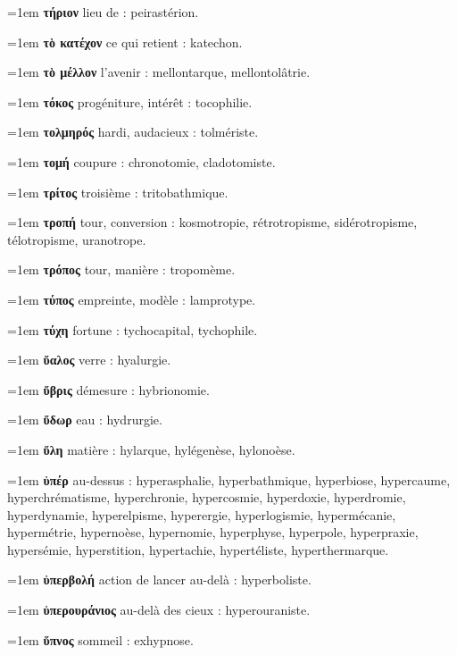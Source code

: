 \hangindent=1em \textbf{τήριον} lieu de : peirastérion.\par
\hangindent=1em \textbf{τὸ κατέχον} ce qui retient : katechon.\par
\hangindent=1em \textbf{τὸ μέλλον} l'avenir : mellontarque, mellontolâtrie.\par
\hangindent=1em \textbf{τόκος} progéniture, intérêt : tocophilie.\par
\hangindent=1em \textbf{τολμηρός} hardi, audacieux : tolmériste.\par
\hangindent=1em \textbf{τομή} coupure : chronotomie, cladotomiste.\par
\hangindent=1em \textbf{τρίτος} troisième : tritobathmique.\par
\hangindent=1em \textbf{τροπή} tour, conversion : kosmotropie, rétrotropisme, sidérotropisme, télotropisme, uranotrope.\par
\hangindent=1em \textbf{τρόπος} tour, manière : tropomème.\par
\hangindent=1em \textbf{τύπος} empreinte, modèle : lamprotype.\par
\hangindent=1em \textbf{τύχη} fortune : tychocapital, tychophile.\par
\hangindent=1em \textbf{ὕαλος} verre : hyalurgie.\par
\hangindent=1em \textbf{ὕβρις} démesure : hybrionomie.\par
\hangindent=1em \textbf{ὕδωρ} eau : hydrurgie.\par
\hangindent=1em \textbf{ὕλη} matière : hylarque, hylégenèse, hylonoèse.\par
\hangindent=1em \textbf{ὑπέρ} au-dessus : hyperasphalie, hyperbathmique, hyperbiose, hypercaume, hyperchrématisme, hyperchronie, hypercosmie, hyperdoxie, hyperdromie, hyperdynamie, hyperelpisme, hyperergie, hyperlogismie, hypermécanie, hypermétrie, hypernoèse, hypernomie, hyperphyse, hyperpole, hyperpraxie, hypersémie, hyperstition, hypertachie, hypertéliste, hyperthermarque.\par
\hangindent=1em \textbf{ὑπερβολή} action de lancer au-delà : hyperboliste.\par
\hangindent=1em \textbf{ὑπερουράνιος} au-delà des cieux : hyperouraniste.\par
\hangindent=1em \textbf{ὕπνος} sommeil : exhypnose.\par
